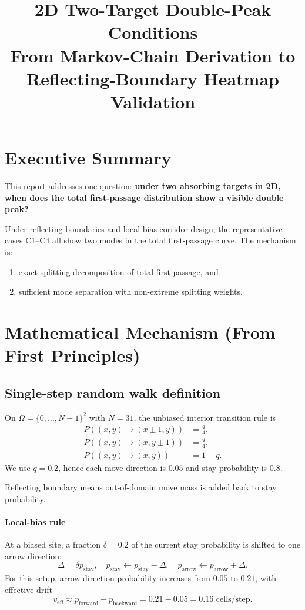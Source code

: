 \documentclass[11pt]{article}
\title{2D Two-Target Double-Peak Conditions\\\large From Markov-Chain Derivation to Reflecting-Boundary Heatmap Validation}
\author{}
\date{}
\begin{document}
\maketitle

\section*{Executive Summary}
This report addresses one question:
\textbf{under two absorbing targets in 2D, when does the total first-passage distribution show a visible double peak?}

Under reflecting boundaries and local-bias corridor design, the representative cases C1--C4 all show two modes in the total first-passage curve. The mechanism is:
\begin{enumerate}
  \item exact splitting decomposition of total first-passage, and
  \item sufficient mode separation with non-extreme splitting weights.
\end{enumerate}

\section{Mathematical Mechanism (From First Principles)}
\subsection{Single-step random walk definition}
On $\Omega=\{0,\ldots,N-1\}^2$ with $N=31$, the unbiased interior transition rule is
\begin{align}
P((x,y)\to(x\pm1,y))&=\frac{q}{4},\\
P((x,y)\to(x,y\pm1))&=\frac{q}{4},\\
P((x,y)\to(x,y))&=1-q.
\end{align}
We use $q=0.2$, hence each move direction is $0.05$ and stay probability is $0.8$.

Reflecting boundary means out-of-domain move mass is added back to stay probability.

\paragraph{Local-bias rule}
At a biased site, a fraction $\delta=0.2$ of the current stay probability is shifted to one arrow direction:
\begin{equation}
\Delta=\delta p_{\mathrm{stay}},\quad
p_{\mathrm{stay}}\leftarrow p_{\mathrm{stay}}-\Delta,\quad
p_{\mathrm{arrow}}\leftarrow p_{\mathrm{arrow}}+\Delta.
\end{equation}
For this setup, arrow-direction probability increases from $0.05$ to $0.21$, with effective drift
\begin{equation}
v_{\mathrm{eff}}\approx p_{\mathrm{forward}}-p_{\mathrm{backward}}=0.21-0.05=0.16 \text{ cells/step}.
\end{equation}
\end{document}
